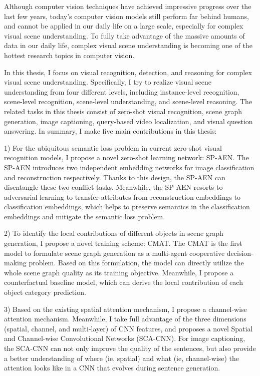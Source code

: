 \begin{englishabstract}

Although computer vision techniques have achieved impressive progress over the last few years, today's computer vision models still perform far behind humans, and cannot be applied in our daily life on a large scale, especially for complex visual scene understanding. To fully take advantage of the massive amounts of data in our daily life, complex visual scene understanding is becoming one of the hottest research topics in computer vision.

In this thesis, I focus on visual recognition, detection, and reasoning for complex visual scene understanding. Specifically, I try to realize visual scene understanding from four different levels, including instance-level recognition, scene-level recognition, scene-level understanding, and scene-level reasoning. The related tasks in this thesis consist of zero-shot visual recognition, scene graph generation, image captioning, query-based video localization, and visual question answering. In summary, I make five main contributions in this thesis:

1) For the ubiquitous semantic loss problem in current zero-shot visual recognition models, I propose a novel zero-shot learning network: SP-AEN. The SP-AEN introduces two independent embedding networks for image classification and reconstruction respectively. Thanks to this design, the SP-AEN can disentangle these two conflict tasks. Meanwhile, the SP-AEN resorts to adversarial learning to transfer attributes from reconstruction embeddings to classification embeddings, which helps to preserve semantics in the classification embeddings and mitigate the semantic loss problem.

2) To identify the local contributions of different objects in scene graph generation, I propose a novel training scheme: CMAT. The CMAT is the first model to formulate scene graph generation as a multi-agent cooperative decision-making problem. Based on this formulation, the model can directly utilize the whole scene graph quality as its training objective. Meanwhile, I propose a counterfactual baseline model, which can derive the local contribution of each object category prediction.

3) Based on the existing spatial attention mechanism, I propose a channel-wise attention mechanism. Meanwhile, I take full advantage of the three dimensions (spatial, channel, and multi-layer) of CNN features, and proposes a novel Spatial and Channel-wise Convolutional Networks (SCA-CNN). For image captioning, the SCA-CNN can not only improve the quality of the sentences, but also provide a better understanding of where (ie, spatial) and what (ie, channel-wise) the attention looks like in a CNN that evolves during sentence generation.


\end{englishabstract}
